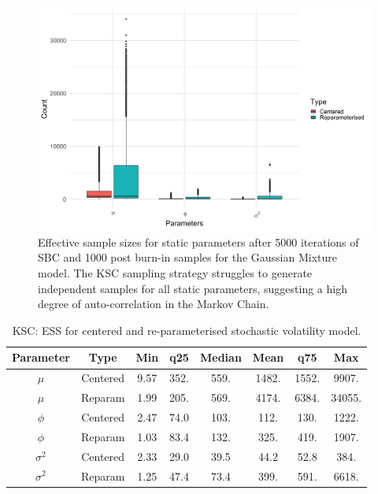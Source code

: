 \documentclass[12pt, a4paper]{article}
\begin{document}
    \begin{figure}[H]
        \centering
        \includegraphics[scale=0.1]{results/ksc_ess.png}
        \caption{Effective sample sizes for static parameters after 5000 iterations of SBC and 1000 post burn-in samples for the Gaussian Mixture model. The KSC sampling strategy struggles to generate independent samples for all static parameters, suggesting a high degree of auto-correlation in the Markov Chain.}
        \label{fig:kscess}
    \end{figure}

    \begin{table}[H]
        \centering
        \begin{tabular}{|c|c|c|c|c|c|c|c|} \hline 
        Parameter &  Type&Min& q25&  Median& Mean & q75&Max\\ \hline 
        $\mu$&  Centered&9.57 & 352. & 559. & 1482. & 1552. & 9907.\\
     $\mu$&  Reparam&1.99 & 205. & 569. & 4174. & 6384. & 34055.\\\hline 
     $\phi$&  Centered&2.47 & 74.0 & 103. & 112. & 130. & 1222.\\
     $\phi$&  Reparam&1.03 & 83.4 & 132. & 325. & 419. & 1907. \\ \hline 
     $\sigma^2$&  Centered&2.33 & 29.0 & 39.5 & 44.2 & 52.8 & 384. \\ 
     $\sigma^2$&  Reparam&1.25 & 47.4 & 73.4 & 399. & 591. & 6618. \\ \hline
        \end{tabular}
        \caption{KSC: ESS for centered and re-parameterised stochastic volatility model.}
        \label{tab:kscess}
    \end{table}
\end{document}
